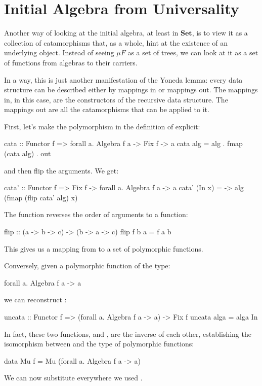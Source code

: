 \documentclass[DaoFP]{subfiles}
\begin{document}
\section{Initial Algebra from Universality}

Another way of looking at the initial algebra, at least in $\mathbf{Set}$, is to view it as a collection of catamorphisms that, as a whole, hint at the existence of an underlying object. Instead of seeing $\mu F$ as a set of trees, we can look at it as a set of functions from algebras to their carriers. 

In a way, this is just another manifestation of the Yoneda lemma: every data structure can be described either by mappings in or mappings out. The mappings in, in this case, are the constructors of the recursive data structure. The mappings out are all the catamorphisms that can be applied to it.

First, let's make the polymorphism in the definition of  explicit:
\begin{haskell}
cata :: Functor f => forall a. Algebra f a -> Fix f -> a
cata alg = alg . fmap (cata alg) . out
\end{haskell}
and then flip the arguments. We get:
\begin{haskell}
cata' :: Functor f => Fix f -> forall a. Algebra f a -> a
cata' (In x) = \alg -> alg (fmap (flip cata' alg) x)
\end{haskell}
The function  reverses the order of arguments to a function:
\begin{haskell}
flip :: (a -> b -> c) -> (b -> a -> c)
flip f b a = f a b
\end{haskell}
This gives us a mapping from  to a set of polymorphic functions.

Conversely, given a polymorphic function of the type:
\begin{haskell}
forall a. Algebra f a -> a
\end{haskell}
we can reconstruct :
\begin{haskell}
uncata :: Functor f => (forall a. Algebra f a -> a) -> Fix f
uncata alga = alga In
\end{haskell}
In fact, these two functions,  and , are the inverse of each other, establishing the isomorphism between  and the type of polymorphic functions:
\begin{haskell}
data Mu f = Mu (forall a. Algebra f a -> a)
\end{haskell}
We can now substitute  everywhere we used  .
\end{document}
